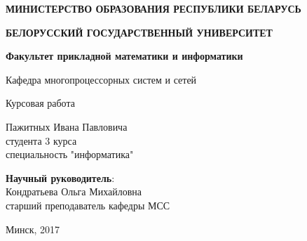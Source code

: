 \begin{titlepage}
    \begin{center}
         \textbf{МИНИСТЕРСТВО ОБРАЗОВАНИЯ РЕСПУБЛИКИ БЕЛАРУСЬ}
    \end{center}
    \begin{center}
         \textbf{БЕЛОРУССКИЙ ГОСУДАРСТВЕННЫЙ УНИВЕРСИТЕТ}
    \end{center}
    \begin{center}
         \textbf{Факультет прикладной математики и информатики}
    \end{center}
    \begin{center}
        Кафедра многопроцессорных систем и сетей
    \end{center}

    \vspace{9em}

    \begin{center}
        \textbf{\@jobtitle}
    \end{center}

    \vspace{2em}

    \begin{center}
        Курсовая работа
    \end{center}

    \vspace{4em}

    \begin{flushright}
        Пажитных Ивана Павловича\\
        студента 3 курса\\
        специальность "информатика"\\
    \end{flushright}

    \vspace{1em}

    \begin{flushright}
         \textbf{Научный руководитель}:\\
        Кондратьева Ольга Михайловна\\
        старший преподаватель кафедры МСС\\
    \end{flushright}

    \vfill

    \begin{center}
        Минск, 2017
    \end{center}
\end{titlepage}
\newpage
